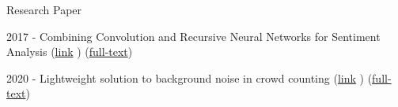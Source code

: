 \documentclass{resume} %
\begin{document}
\begin{rSection}{Research Paper}

2017 - Combining Convolution and Recursive Neural Networks for Sentiment Analysis (\href{https://dl.acm.org/doi/abs/10.1145/3155133.3155158}{link}  )
(\href{https://github.com/ttpro1995/soICT2017/releases/tag/v1.1}{full-text})

2020 - Lightweight solution to background noise in crowd counting 
(\href{https://ieeexplore.ieee.org/document/9335834}{link}  )
(\href{https://github.com/ttpro1995/NICS2020_paper/releases/tag/v1}{full-text})

\end{rSection}
\end{document}
